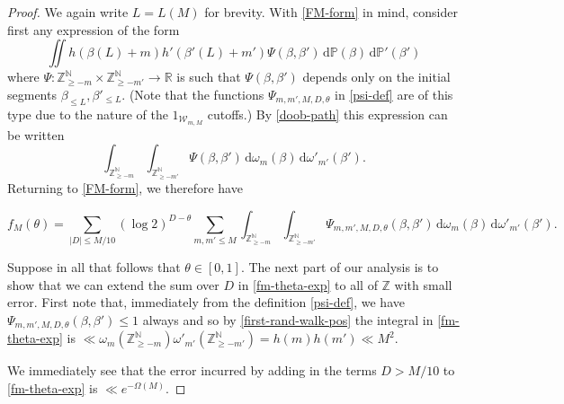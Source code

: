 \documentclass[11pt,reqno]{amsart}
\numberwithin{equation}{section}
\theoremstyle{definition}
\theoremstyle{remark}
\newcommand{\mb}{\mathbb}
\renewcommand{\le}{\leqslant}
\renewcommand{\ge}{\geqslant}
\newcommand\Z{\mathbb{Z}}
\newcommand\R{\mathbb{R}}
\newcommand\N{\mathbb{N}}
\begin{document}
\begin{proof}
We again write $L = L(M)$ for brevity.
With \cref{FM-form} in mind, consider first any expression of the form
\[ \iint h(\beta(L) + m) h'(\beta'(L) + m') \Psi(\beta, \beta')\, \mathrm{d}\mb{P}(\beta)\, \mathrm{d}\mb{P}'(\beta')\] where $\Psi : \Z^\N_{\ge -m} \times \Z^\N_{\ge -m'} \rightarrow \R$ is such that $\Psi(\beta,\beta')$ depends only on the initial segments $\beta_{\le L}, \beta'_{\le L}$. (Note that the functions $\Psi_{m,m',M,D,\theta}$ in \cref{psi-def} are of this type due to the nature of the $1_{\mathscr{W}_{m,M}}$ cutoffs.) By \cref{doob-path} this expression can be written 
\begin{equation*}  \int_{\Z^\N_{\ge -m}}\int_{\Z^\N_{\ge -m'}} \Psi(\beta,\beta')  \, \mathrm{d}\omega_m (\beta)\, \mathrm{d}\omega'_{m'}(\beta').\end{equation*} 
Returning to \cref{FM-form}, we therefore have

\begin{equation}\label{fm-theta-exp} f_M(\theta) =  \sum_{|D| \le M/10} (\log 2)^{D - \theta} \sum_{m, m' \le M} \int_{\Z^\N_{\ge -m}}\int_{\Z^\N_{\ge -m'}}  \Psi_{m,m',M,D,\theta}(\beta, \beta') \, \mathrm{d}\omega_m(\beta) \, \mathrm{d}\omega'_{m'}(\beta').
\end{equation}

Suppose in all that follows that $\theta \in [0,1]$. The next part of our analysis is to show that we can extend the sum over $D$ in \cref{fm-theta-exp} to all of $\Z$ with small error.  First note that, immediately from the definition \cref{psi-def}, we have $\Psi_{m,m',M,D,\theta}(\beta, \beta') \le 1$ always and so by \cref{first-rand-walk-pos} the integral in \cref{fm-theta-exp} is $\ll \omega_m(\Z^{\N}_{\ge -m}) \omega'_{m'}(\Z^{\N}_{\ge -m'}) = h(m) h(m') \ll M^2$.

We immediately see that the error incurred by adding in the terms $D > M/10$ to \cref{fm-theta-exp} is $\ll e^{-\Omega(M)}$.


\end{proof}
\end{document}
